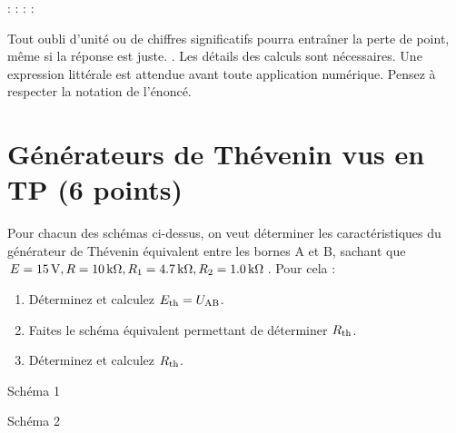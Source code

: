 \documentclass[10pt,a4paper]{article}
\begin{document}
\noindent {} : \hfill {} : \hfill {} : \hfill {} :
\hspace*{3em}\bigbreak

Tout oubli d’unité ou de chiffres significatifs pourra entraîner la perte de
point, même si la réponse est juste. . Les détails des calculs sont nécessaires. Une expression littérale
est attendue avant toute application numérique. Pensez à respecter la notation
de l'énoncé.

\section{Générateurs de Thévenin vus en TP (6 points)}
\begin{figure}[htbp!]
    \vspace*{-20pt}
    \centering
    \hspace{3cm}
    \caption{}
\end{figure}

Pour chacun des schémas ci-dessus, on veut déterminer les caractéristiques du
générateur de Thévenin équivalent entre les bornes A et B, sachant que $E =
\SI{15}{V}, R = \SI{10}{k\Omega}, R_1 = \SI{4.7}{k\Omega}, R_2 = \SI{1.0}{k\Omega}$. Pour
cela :

\begin{enumerate}[label=\color{brandeisblue}\arabic*)]
    \item Déterminez et calculez $E _{\text{th}} = U _{\text{AB}}$.
    \item Faites le schéma équivalent permettant de déterminer $R _{\text{th}}$.
    \item Déterminez et calculez $R _{\text{th}}$.
\end{enumerate}

\begin{minipage}[c]{0.49999\textwidth}
    \begin{center}
        Schéma 1
    \end{center}
    \raggedleft\vrule height 14cm
\end{minipage}%
\begin{minipage}[c]{0.49999\textwidth}
    \begin{center}
        Schéma 2
    \end{center}
    \vspace{14cm}
\end{minipage}
\end{document}

